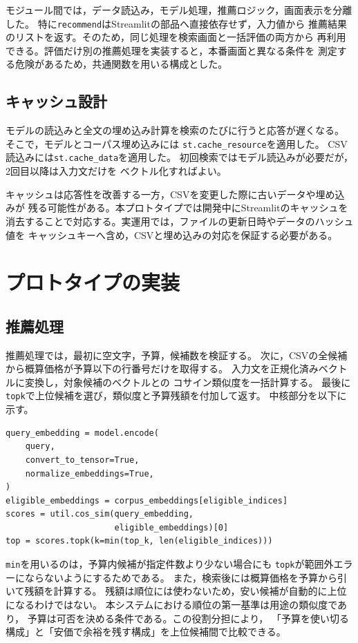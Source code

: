 \documentclass[a4paper,11pt]{article}
\begin{document}
モジュール間では，データ読込み，モデル処理，推薦ロジック，画面表示を分離した。
特に\verb|recommend|はStreamlitの部品へ直接依存せず，入力値から
推薦結果のリストを返す。そのため，同じ処理を検索画面と一括評価の両方から
再利用できる。評価だけ別の推薦処理を実装すると，本番画面と異なる条件を
測定する危険があるため，共通関数を用いる構成とした。

\subsection{キャッシュ設計}
モデルの読込みと全文の埋め込み計算を検索のたびに行うと応答が遅くなる。
そこで，モデルとコーパス埋め込みには
\verb|st.cache_resource|を適用した。
CSV読込みには\verb|st.cache_data|を適用した。
初回検索ではモデル読込みが必要だが，2回目以降は入力文だけを
ベクトル化すればよい。

キャッシュは応答性を改善する一方，CSVを変更した際に古いデータや埋め込みが
残る可能性がある。本プロトタイプでは開発中にStreamlitのキャッシュを
消去することで対応する。実運用では，ファイルの更新日時やデータのハッシュ値を
キャッシュキーへ含め，CSVと埋め込みの対応を保証する必要がある。


\section{プロトタイプの実装}

\subsection{推薦処理}
推薦処理では，最初に空文字，予算，候補数を検証する。
次に，CSVの全候補から概算価格が予算以下の行番号だけを取得する。
入力文を正規化済みベクトルに変換し，対象候補のベクトルとの
コサイン類似度を一括計算する。
最後に\verb|topk|で上位候補を選び，類似度と予算残額を付加して返す。
中核部分を以下に示す。

\begin{screen}
\begin{verbatim}
query_embedding = model.encode(
    query,
    convert_to_tensor=True,
    normalize_embeddings=True,
)
eligible_embeddings = corpus_embeddings[eligible_indices]
scores = util.cos_sim(query_embedding,
                      eligible_embeddings)[0]
top = scores.topk(k=min(top_k, len(eligible_indices)))
\end{verbatim}
\end{screen}

\verb|min|を用いるのは，予算内候補が指定件数より少ない場合にも
\verb|topk|が範囲外エラーにならないようにするためである。
また，検索後には概算価格を予算から引いて残額を計算する。
残額は順位には使わないため，安い候補が自動的に上位になるわけではない。
本システムにおける順位の第一基準は用途の類似度であり，
予算は可否を決める条件である。この役割分担により，
「予算を使い切る構成」と「安価で余裕を残す構成」を上位候補間で比較できる。
\end{document}
